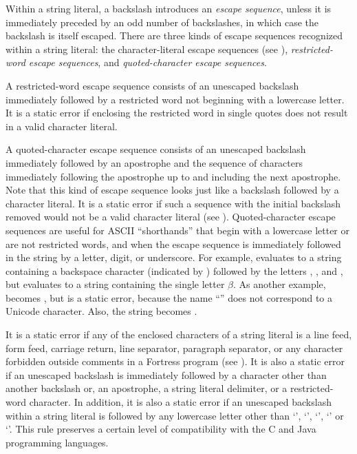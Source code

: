 Within a string literal,
a backslash introduces an \emph{escape sequence},
unless it is immediately preceded by an odd number of backslashes,
in which case the backslash is itself escaped.
There are three kinds of escape sequences
recognized within a string literal:
the character-literal escape sequences
(see ),
\emph{restricted-word escape sequences},
and \emph{quoted-character escape sequences}.

A restricted-word escape sequence
consists of an unescaped backslash
immediately followed by a restricted word
not beginning with a lowercase letter.
It is a static error if enclosing the restricted word
in single quotes
does not result in a valid character literal.

A quoted-character escape sequence
consists of an unescaped backslash immediately followed by an apostrophe
and the sequence of characters immediately following the apostrophe
up to and including the next apostrophe.
Note that this kind of escape sequence
looks just like a backslash followed by a character literal.
It is a static error if such a sequence
with the initial backslash removed
would not be a valid character literal
(see ).
%
Quoted-character escape sequences are useful
for ASCII ``shorthands''
that begin with a lowercase letter
or are not restricted words,
and when the escape sequence is immediately followed in the string
by a letter, digit, or underscore.
For example,
 evaluates to a string
containing a backspace character (indicated by )
followed by the letters , , and ,
but  evaluates to a string
containing the single letter $\beta$.
As another example,
 becomes ,
but  is a static error,
because the name ``'' does not correspond to a Unicode character.
Also,
the string 
becomes .

It is a static error
if any of the enclosed characters of a string literal is a
line feed, form feed, carriage return,
line separator, paragraph separator,
or any character forbidden outside comments in a Fortress program
(see ).
It is also a static error if an unescaped backslash
is immediately followed by a character other than another backslash or,
an apostrophe,
a string literal delimiter, or a restricted-word character.
In addition,
it is also a static error
if an unescaped backslash within a string literal
is followed by any lowercase letter
other than `', `', `', `' or `'.
This rule preserves a certain level of compatibility
with the C and Java programming languages.

